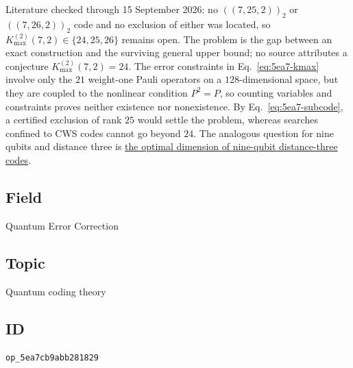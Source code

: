 Literature checked through 15 September 2026: no $((7,25,2))_2$ or
$((7,26,2))_2$ code and no exclusion of either was located, so
$K_{\max}^{(2)}(7,2)\in\{24,25,26\}$ remains open.  The problem is the gap
between an exact construction and the surviving general upper bound; no source
attributes a conjecture $K_{\max}^{(2)}(7,2)=24$.  The error constraints in
Eq.~\eqref{eq:5ea7-kmax} involve only the $21$ weight-one Pauli operators on a
$128$-dimensional space, but they are coupled to the nonlinear condition
$P^2=P$, so counting variables and constraints proves neither existence nor
nonexistence.  By Eq.~\eqref{eq:5ea7-subcode}, a certified exclusion of rank
$25$ would settle the problem, whereas searches confined to CWS codes cannot go
beyond $24$.  The analogous question for nine qubits and distance three is
\href{https://qiqc-op.com/problem/op_0d6ac674da115857/}{the optimal dimension of
nine-qubit distance-three codes}.

\subsection*{Field}

Quantum Error Correction

\subsection*{Topic}

Quantum coding theory

\subsection*{ID}

\texttt{op\_5ea7cb9abb281829}
